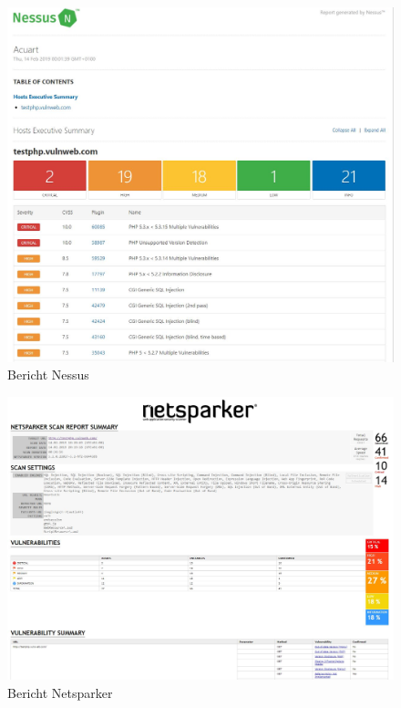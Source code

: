 \documentclass[12pt,oneside,a4paper,parskip,pointlessnumbers]{scrbook}
\begin{document}
  \begin{figure}[htb!]
    \centering
      \includegraphics[width=1.05\textwidth]{Images/ScrNessus}
    \caption[Bericht Nessus]{Bericht Nessus}
  \end{figure}
  \begin{figure}[htb!]
    \centering
      \includegraphics[width=1.05\textwidth]{Images/ScrNetsparker}
    \caption[Bericht Netsparker]{Bericht Netsparker}
  \end{figure}
\end{document}
